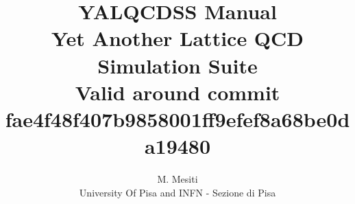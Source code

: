 \documentclass[a4paper,10pt]{book}
\title{{\Huge \bf YALQCDSS Manual} \\
Yet Another Lattice QCD Simulation Suite \\
{\small Valid around commit 
fae4f48f407b9858001ff9efef8a68be0da19480}}
\author{M. Mesiti\\{\small University Of Pisa and INFN - Sezione di Pisa}}
\begin{document}
\maketitle
\date{}
 

  

  
 
  
  
%  
\end{document}
